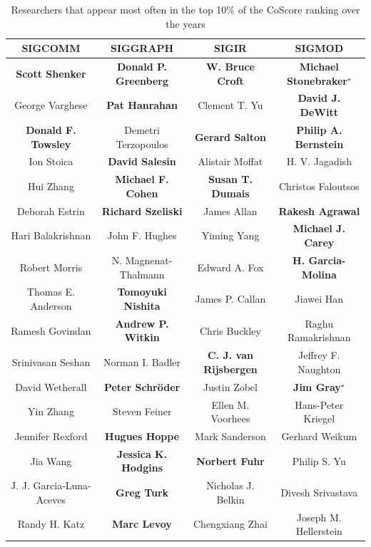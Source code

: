 \documentclass{sig-alternate-10pt}
\begin{document}
\begin{table}[t]
\centering
\caption{Researchers that appear most often in the top 10\% of the CoScore ranking over the years}
\begin{scriptsize}
\begin{tabular}{|c|c|c|c|} \hline
\textbf{SIGCOMM} & \textbf{SIGGRAPH} & \textbf{SIGIR} & \textbf{SIGMOD}\\ \hline
\textbf{Scott Shenker} & \textbf{Donald P. Greenberg} & \textbf{W. Bruce Croft} & \textbf{Michael Stonebraker}$^\star$\\ \hline
George Varghese & \textbf{Pat Hanrahan} & Clement T. Yu & \textbf{David J. DeWitt}\\ \hline
\textbf{Donald F. Towsley} & Demetri Terzopoulos & \textbf{Gerard Salton} & \textbf{Philip A. Bernstein}\\ \hline
Ion Stoica & \textbf{David Salesin} & Alistair Moffat & H. V. Jagadish\\ \hline
Hui Zhang & \textbf{Michael F. Cohen} & \textbf{Susan T. Dumais} & Christos Faloutsos\\ \hline
Deborah Estrin & \textbf{Richard Szeliski} & James Allan & \textbf{Rakesh Agrawal}\\ \hline
Hari Balakrishnan & John F. Hughes & Yiming Yang & \textbf{Michael J. Carey}\\ \hline
Robert Morris & N. Magnenat-Thalmann & Edward A. Fox & \textbf{H. Garcia-Molina}\\ \hline
Thomas E. Anderson & \textbf{Tomoyuki Nishita} & James P. Callan & Jiawei Han\\ \hline
Ramesh Govindan & \textbf{Andrew P. Witkin} & Chris Buckley & Raghu Ramakrishnan\\ \hline
Srinivasan Seshan & Norman I. Badler & \textbf{C. J. van Rijsbergen} & Jeffrey F. Naughton\\ \hline
David Wetherall & \textbf{Peter Schröder} & Justin Zobel & \textbf{Jim Gray}$^\star$\\ \hline
Yin Zhang & Steven Feiner & Ellen M. Voorhees & Hans-Peter Kriegel\\ \hline
Jennifer Rexford & \textbf{Hugues Hoppe} & Mark Sanderson & Gerhard Weikum\\ \hline
Jia Wang & \textbf{Jessica K. Hodgins} & \textbf{Norbert Fuhr} & Philip S. Yu\\ \hline
J. J. Garcia-Luna-Aceves & \textbf{Greg Turk} & Nicholas J. Belkin & Divesh Srivastava\\ \hline
Randy H. Katz & \textbf{Marc Levoy} & Chengxiang Zhai & Joseph M. Hellerstein\\ \hline

\end{tabular}
\end{scriptsize}
\end{table}
\end{document}
